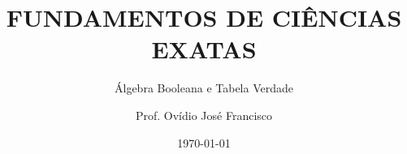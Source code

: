 \documentclass[xcolor=dvipsnames]{beamer}
\author{Prof. Ovídio José Francisco}
\title{FUNDAMENTOS DE CIÊNCIAS EXATAS}
\subtitle{Álgebra Booleana e Tabela Verdade}
\date{\today}
\begin{document}
\small





\frameTitle






\end{document}
